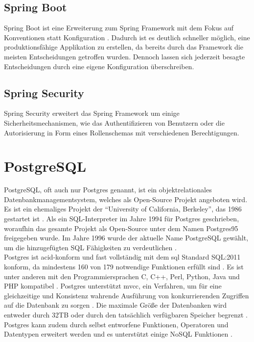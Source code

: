\subsection{Spring Boot} \label{spring-boot}
Spring Boot ist eine Erweiterung zum Spring Framework mit dem Fokus auf Konventionen statt Konfiguration \cite[S.~31]{spring-book-3}. Dadurch ist es deutlich schneller möglich, eine produktionsfähige Applikation zu erstellen, da bereits durch das Framework die meisten Entscheidungen getroffen wurden. Dennoch lassen sich jederzeit besagte Entscheidungen durch eine eigene Konfiguration überschreiben.

\subsection{Spring Security}
Spring Security erweitert das Spring Framework um einige Sicherheitsmechanismen, wie das Authentifizieren von Benutzern oder die Autorisierung in Form eines Rollenschemas mit verschiedenen Berechtigungen.

\clearpage

\section{PostgreSQL} \label{postgres}
PostgreSQL, oft auch nur Postgres genannt, ist ein objektrelationales Datenbankmanagementsystem, welches als Open-Source Projekt angeboten wird.
Es ist ein ehemaliges Projekt der \enquote{University of California, Berkeley}, das 1986 gestartet ist \cite{postgres-history}.
Als ein SQL-Interpreter im Jahre 1994 für Postgres geschrieben, woraufhin das gesamte Projekt als Open-Source unter dem Namen Postgres95 freigegeben wurde.
Im Jahre 1996 wurde der aktuelle Name PostgreSQL gewählt, um die hinzugefügten SQL Fähigkeiten zu verdeutlichen \cite{postgres-history}.
\\
Postgres ist \gls{acid}-konform und fast vollständig mit dem \gls{sql} Standard SQL:2011 konform, da mindestens 160 von 179 notwendige Funktionen erfüllt sind \cite{postgres-about}.
Es ist unter anderen mit den Programmiersprachen C, C++, Perl, Python, Java und PHP kompatibel \cite{postgres}.
Postgres unterstützt \gls{mvcc}, ein Verfahren, um für eine gleichzeitige und Konsistenz wahrende Ausführung von konkurrierenden Zugriffen auf die Datenbank zu sorgen \cite{postgres-about}. Die maximale Größe der Datenbanken wird entweder durch 32TB oder durch den tatsächlich verfügbaren Speicher begrenzt \cite{postgres-about}. Postgres kann zudem durch selbst entworfene Funktionen, Operatoren und Datentypen erweitert werden und es unterstützt einige NoSQL Funktionen \cite{postgres-about}.

